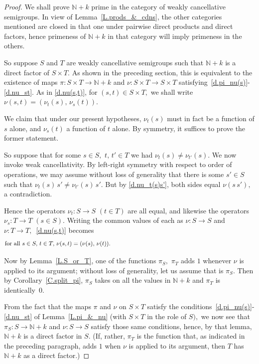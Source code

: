 \documentclass{amsart}
\numberwithin{equation}{section}
\numberwithin{theorem}{section}
\newcommand{\N}{\mathbb{N}}
\begin{document}
\begin{proof}
We shall prove $\N\!+\!k$ prime in the
category of weakly cancellative semigroups.
In view of Lemma~\ref{L.prods_&_cdns}, the other categories
mentioned are closed in that one under pairwise
direct products and direct factors, hence primeness of $\N\!+\!k$ in
that category will imply primeness in the others.

So suppose $S$ and $T$ are weakly cancellative semigroups such that
$\N\!+\!k$ is a direct factor of $S\times T.$
As shown in  the preceding section, this is equivalent to
the existence of maps $\pi: S\times T\to\N\!+\!k$ and
$\nu: S\times T\to S\times T$
satisfying~\eqref{d.pi_nu(s)}-\eqref{d.nu_st}.
As in \eqref{d.nu(s,t)}, for $(s,t)\in S\times T,$ we shall write
$\nu(s,t) = (\nu_t(s),\,\nu_s(t)).$

We claim that under our present hypotheses, $\nu_t(s)$ must in fact
be a function of $s$ alone, and $\nu_s(t)$ a function of $t$ alone.
By symmetry, it suffices to prove the former statement.

So suppose that for some $s\in S,$ $t,\,t'\in T$ we had
$\nu_t(s)\neq\nu_{t'}(s).$
We now invoke weak cancellativity.
By left-right symmetry with respect to order of
operations, we may assume without loss
of generality that there is some $s'\in S$ such that
$\nu_t(s)\,s'\neq\nu_{t'}(s)\,s'.$
But by \eqref{d.nu_t(s)s'}, both sides equal $\nu(s\,s'),$
a contradiction.

Hence the operators $\nu_t\!: S\to S$ $(t\in T)$
are all equal, and likewise the operators $\nu_s\!: T\to T$ $(s\in S).$
Writing the common values of each as $\nu:S\to S$ and
$\nu:T\to T,$~\eqref{d.nu(s,t)} becomes
%
\begin{equation}\begin{minipage}[c]{35pc}\label{d.better_nu}
for all $s\in S,$ $t\in T,$ $\nu(s,t) = (\nu(s),\,\nu(t)).$
\end{minipage}\end{equation}

Now by Lemma~\ref{L.S_or_T}, one of the functions $\pi_S,$
$\pi_T$ adds $1$ whenever $\nu$ is applied to its argument;
without loss of generality, let us assume that is $\pi_S.$
Then by Corollary~\ref{C.split_pi}, $\pi_S$ takes on
all the values in $\N\!+\!k$ and $\pi_T$ is identically~$0.$

From the fact that the maps $\pi$ and $\nu$ on $S\times T$
satisfy the conditions~\eqref{d.pi_nu(s)}-\eqref{d.nu_st}
of Lemma~\ref{L.pi_&_nu} (with $S\times T$ in the role of $S),$
we now see that $\pi_S: S\to \N\!+\!k$
and $\nu: S\to S$ satisfy those same conditions,
hence, by that lemma, $\N\!+\!k$ is a direct factor in $S.$
(If, rather, $\pi_T$ is the function that, as indicated
in the preceding paragraph, adds $1$ when $\nu$ is applied
to its argument, then $T$ has $\N\!+\!k$ as a direct factor.)
\end{proof}
\end{document}
